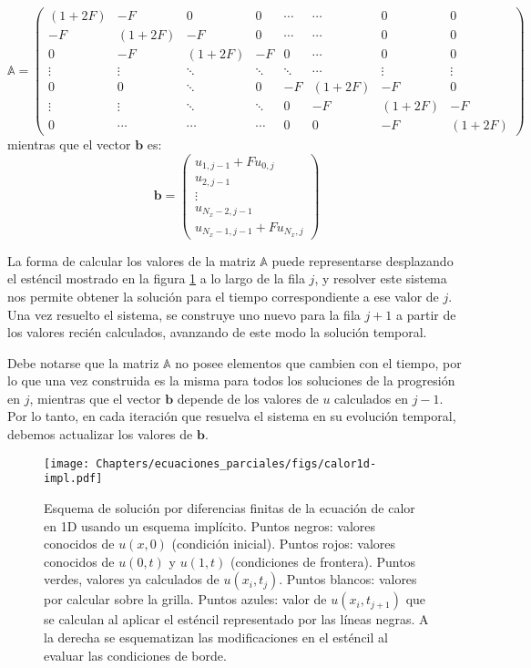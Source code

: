 \begin{equation*}
 \mathbb{A} = 
 \begin{pmatrix}
  (1+2F) & -F &    0    & 0 & \cdots  & \cdots  &  0  & 0\\
  -F     & (1+2F) & -F & 0  & \cdots   &     \cdots   &  0  & 0 \\
  0      & -F & (1+2F) & -F & 0   & \cdots &  0  & 0 \\   
  \vdots & \vdots & \ddots & \ddots & \ddots & \cdots &  \vdots  & \vdots \\ 
  0      &  0     & \ddots  & 0& -F & (1+2F) & -F & 0 \\
 \vdots  &   \vdots    & \ddots  &  \ddots &  0  &-F & (1+2F) & -F\\
  0      & \cdots& \cdots  &   \cdots & 0     &   0     & -F & (1+2F)
 \end{pmatrix}
 \end{equation*}
mientras que el vector $\bm{b}$ es:
 \begin{equation*}
 \bm{b} =
 \begin{pmatrix}
  u_{1,j-1} + F u_{0,j} \\
  u_{2,j-1} \\
  \vdots \\
  u_{N_x -2,j-1} \\
  u_{N_x -1,j-1} + F u_{N_x, j}
 \end{pmatrix}
 \end{equation*} 

La forma de calcular los valores de la matriz $\mathbb{A}$ puede representarse desplazando el esténcil mostrado en la figura \ref{fig:calor1dimpl} a lo largo de la fila $j$, y resolver este sistema nos permite obtener la solución para el tiempo correspondiente a ese valor de $j$. Una vez resuelto el sistema, se construye uno nuevo para la fila $j+1$ a partir de los valores recién calculados, avanzando de este modo la solución temporal.

Debe notarse que la matriz $\mathbb{A}$ no posee elementos que cambien con el tiempo, por lo que una vez construida es la misma para todos los soluciones de la progresión en $j$, mientras que el vector $\bm{b}$ depende de los valores de $u$ calculados en  $j-1$. Por lo tanto, en cada iteración que resuelva el sistema en su evolución temporal, debemos actualizar los valores de $\bm{b}$.

\begin{figure}[t]
 \centering
 \texttt{[image: Chapters/ecuaciones\_parciales/figs/calor1d-impl.pdf]}
 \caption{Esquema de solución por diferencias finitas de la ecuación de calor en 1D usando un esquema implícito. Puntos negros: valores conocidos de $u(x, 0)$ (condición inicial). Puntos rojos: valores conocidos de $u(0, t)$ y $u(1, t)$ (condiciones de frontera). Puntos verdes, valores ya calculados de $u(x_i, t_j)$. Puntos blancos: valores por calcular sobre la grilla. Puntos azules: valor de $u(x_i, t_{j+1})$ que se calculan al aplicar el esténcil representado por las líneas negras. A la derecha se esquematizan las modificaciones en el esténcil al evaluar las condiciones de borde.}
 \label{fig:calor1dimpl}
\end{figure}


